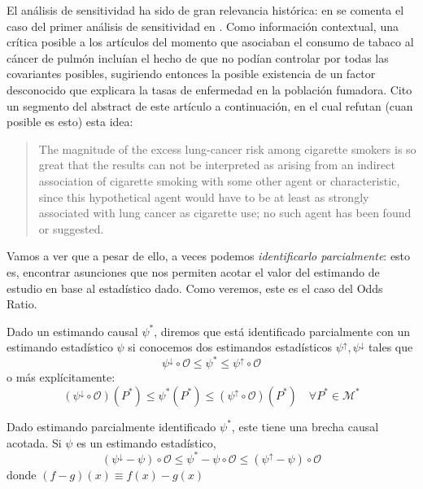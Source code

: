 \begin{nota}
	El análisis de sensitividad ha sido de gran relevancia histórica: en \cite[5: Sensitivity to Unmeasured Covariates]{rosenbaumCausalInference2023}
	se comenta el caso del primer análisis de sensitividad en \cite{cornfield1959}. %
	Como información contextual, una crítica posible a los artículos del momento que asociaban el consumo de tabaco
	al cáncer de pulmón incluían el hecho de que no podían controlar
	por todas las covariantes posibles, sugiriendo entonces la posible existencia de
	un factor desconocido que explicara la tasas de enfermedad en la población fumadora.
	Cito un segmento del abstract de este artículo a continuación, en el cual refutan (cuan posible es esto) esta idea:
	\begin{quotation}
		The magnitude of the excess lung-cancer risk among cigarette smokers is so great that
		the results can not be interpreted as arising from an indirect association of cigarette
		smoking with some other agent or characteristic, since this hypothetical agent would have
		to be at least as strongly associated with lung cancer as cigarette use; no such agent has
		been found or suggested.
	\end{quotation}
\end{nota}

Vamos a ver que a pesar de ello, a veces podemos \textit{identificarlo parcialmente}: esto es,
encontrar asunciones que nos permiten acotar el valor del estimando de estudio en base al
estadístico dado.
Como veremos, este es el caso del Odds Ratio.

\begin{definicion} \cite[sección 2.3]{mci}
	Dado un estimando causal $\psi^*$, diremos que está identificado parcialmente
	con un estimando estadístico $\psi$ si conocemos
	dos estimandos estadísticos $\psi^{\uparrow}, \psi^{\downarrow}$ tales que
	$$
		\psi^{\downarrow} \circ \mathcal{O} \leq \psi^* \leq \psi^{\uparrow} \circ \mathcal{O}
	$$
	o más explícitamente:
	$$
		(\psi^{\downarrow} \circ \mathcal{O})(P^*) \leq \psi^*(P^*) \leq (\psi^{\uparrow} \circ \mathcal{O})(P^*) \quad \forall P^* \in \mathcal{M}^*
	$$

\end{definicion}

\begin{corolario}
	Dado estimando parcialmente identificado $\psi^*$, este tiene una brecha causal acotada.
	Si $\psi$ es un estimando estadístico,
	$$
		(\psi^\downarrow - \psi)\circ \mathcal{O} \leq \psi^* - \psi \circ \mathcal{O} \leq (\psi^\uparrow - \psi) \circ \mathcal{O}
	$$
	donde $(f - g)(x) \equiv f(x) - g(x)$
\end{corolario}
